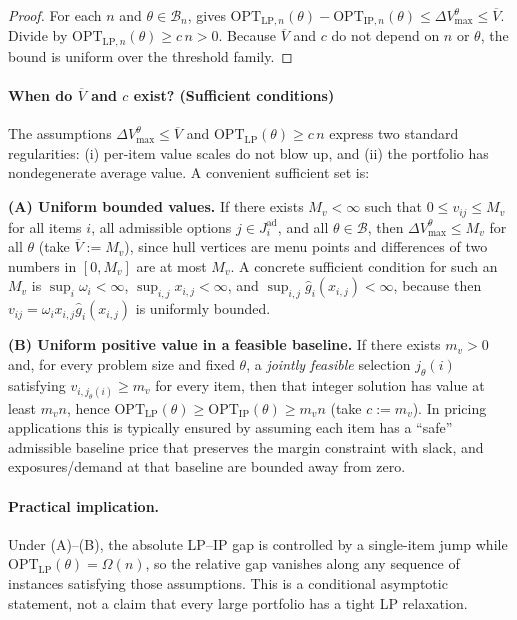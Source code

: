 \documentclass[11pt, a4paper]{article}
\theoremstyle{plain}
\theoremstyle{definition}
\theoremstyle{remark}
\begin{document}
\begin{proof}
For each $n$ and $\theta\in\mathcal B_n$,  gives
$\mathrm{OPT}_{\mathrm{LP},n}(\theta)-\mathrm{OPT}_{\mathrm{IP},n}(\theta)\le \Delta V_{\max}^\theta\le \overline V$.
Divide by $\mathrm{OPT}_{\mathrm{LP},n}(\theta)\ge c\,n>0$. Because $\overline V$ and $c$ do not depend on $n$ or $\theta$, the bound is uniform over the threshold family.
\end{proof}

\paragraph{When do \texorpdfstring{$\overline V$}{Vbar} and $c$ exist? (Sufficient conditions)}
The assumptions $\Delta V_{\max}^\theta\le \overline V$ and $\mathrm{OPT}_{\mathrm{LP}}(\theta)\ge c\,n$ express two standard regularities:
(i) per-item value scales do not blow up, and (ii) the portfolio has nondegenerate average value. A convenient sufficient set is:

\medskip
\noindent\textbf{(A) Uniform bounded values.}
If there exists $M_v<\infty$ such that $0\le v_{ij}\le M_v$ for all items $i$, all admissible options $j\in J_i^{\mathrm{ad}}$, and all
$\theta\in\mathcal B$, then $\Delta V_{\max}^\theta\le M_v$ for all $\theta$ (take $\overline V:=M_v$), since hull vertices are menu points
and differences of two numbers in $[0,M_v]$ are at most $M_v$.
A concrete sufficient condition for such an $M_v$ is
$\sup_i\omega_i<\infty$, $\sup_{i,j}x_{i,j}<\infty$, and $\sup_{i,j}\hat g_i(x_{i,j})<\infty$, because then
$v_{ij}=\omega_i x_{i,j}\hat g_i(x_{i,j})$ is uniformly bounded.

\medskip
\noindent\textbf{(B) Uniform positive value in a feasible baseline.}
If there exists $m_v>0$ and, for every problem size and fixed $\theta$, a \emph{jointly feasible} selection $j_\theta(i)$ satisfying
$v_{i,j_\theta(i)}\ge m_v$ for every item, then that integer solution has value at least $m_v n$, hence
$\mathrm{OPT}_{\mathrm{LP}}(\theta)\ge \mathrm{OPT}_{\mathrm{IP}}(\theta)\ge m_v n$ (take $c:=m_v$).
In pricing applications this is typically ensured by assuming each item has a ``safe'' admissible baseline price that preserves the margin
constraint with slack, and exposures/demand at that baseline are bounded away from zero.

\paragraph{Practical implication.}
Under (A)--(B), the absolute LP--IP gap is controlled by a single-item jump while $\mathrm{OPT}_{\mathrm{LP}}(\theta)=\Omega(n)$, so the
relative gap vanishes along any sequence of instances satisfying those assumptions.  This is a conditional asymptotic statement, not a
claim that every large portfolio has a tight LP relaxation.
\end{document}
